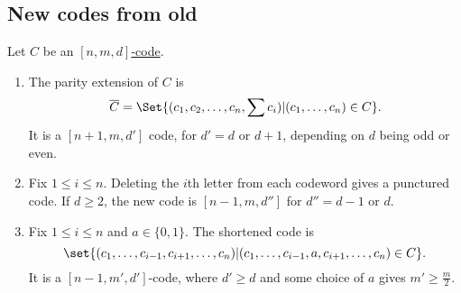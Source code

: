 \documentclass{article}
\newcommand{\1}[1]{\mathbbm{1}_{#1}}
\begin{document}
\subsection{New codes from old}
Let $C$ be an \hyperlink{def:nmdCode}{$[n,m,d]$-code}.
\begin{enumerate}[label=\roman*)]
    \item The \hypertarget{def:parityExtension}{parity extension} of $C$ is
        \begin{equation*}
            \overline{C} = \Set{(c_1, c_2, \dotsc, c_n, \sum c_i) | (c_1, \dotsc, c_n) \in C}.
        \end{equation*}
        It is a $[n+1, m, d']$ code, for $d' = d$ or $d+1$, depending on $d$ being odd or even.
    \item Fix $1 \leq i \leq n$. Deleting the $i$th letter from each codeword gives a \hypertarget{def:puncturedCode}{punctured code}.  If $d \geq 2$, the new code is $[n-1, m, d'']$ for $d'' = d-1$ or $d$.
    \item Fix $1 \leq i \leq n$ and $a \in \{0, 1\}$. The shortened code is
        \begin{equation*}
            \set{(c_1, \dotsc, c_{i-1}, c_{i+1}, \dotsc, c_n) | (c_1, \dotsc, c_{i-1}, a, c_{i+1}, \dotsc, c_n) \in C}.
        \end{equation*}
        It is a $[n-1, m', d']$-code, where $d' \geq d$ and some choice of $a$ gives $m' \geq \frac{m}{2}$.
\end{enumerate}

\end{document}
